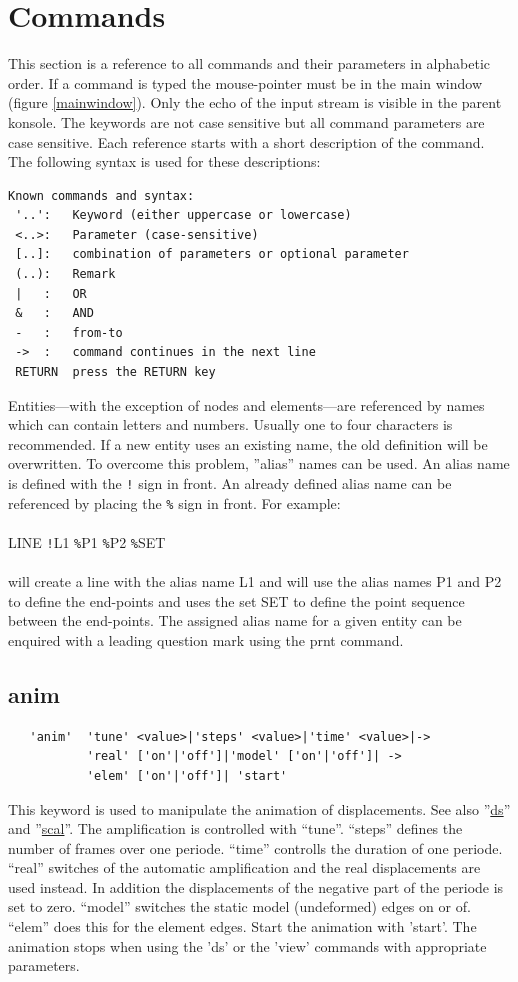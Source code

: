 \documentclass{article}
\providecommand{\htmlref}[2]{\hyperref[#2]{#1}}
\begin{document}
\section{\label{Commands}Commands}
This section is a reference to all commands and their parameters in alphabetic order. If a command is typed the mouse-pointer must be in the main window (figure \ref{mainwindow}). Only the echo of the input stream is visible in the parent konsole. The keywords are not case sensitive but all command parameters are case sensitive. Each reference starts with a short description of the command. The following syntax is used for these descriptions:
\begin{verbatim}
Known commands and syntax:
 '..':   Keyword (either uppercase or lowercase)
 <..>:   Parameter (case-sensitive)
 [..]:   combination of parameters or optional parameter
 (..):   Remark
 |   :   OR
 &   :   AND
 -   :   from-to
 ->  :   command continues in the next line
 RETURN  press the RETURN key 
\end{verbatim}
Entities---with the exception of nodes and elements---are referenced by names which can contain letters and numbers. Usually one to four characters is recommended. If a new entity uses an existing name, the old definition will be overwritten. To overcome this problem, ''alias'' names can be used. An alias name is defined with the \verb_!_ sign in front. An already defined alias name can be referenced by placing the \verb_%_ sign in front. For example:\\\\
LINE \verb_!_L1 \verb_%_P1 \verb_%_P2 \verb_%_SET\\\\will create a line with the alias name L1 and will use the alias names P1 and P2 to define the end-points and uses the set SET to define the point sequence between the end-points. The assigned alias name for a given entity can be enquired with a leading question mark using the prnt command.


\subsection{\label{anim}anim}
\begin{verbatim}
   'anim'  'tune' <value>|'steps' <value>|'time' <value>|->
           'real' ['on'|'off']|'model' ['on'|'off']| ->
           'elem' ['on'|'off']| 'start'
\end{verbatim}
This keyword is used to manipulate the animation of displacements. See also ''\htmlref{ds}{ds}'' and ''\htmlref{scal}{scal}''. The amplification is controlled with ``tune''. ``steps'' defines the number of frames over one periode. ``time'' controlls the duration of one periode. ``real'' switches of the automatic amplification and the real displacements are used instead. In addition the displacements of the negative part of the periode is set to zero. ``model'' switches the static model (undeformed) edges on or of. ``elem'' does this for the element edges. Start the animation with 'start'. The animation stops when using the 'ds' or the 'view' commands with appropriate parameters.
\end{document}
